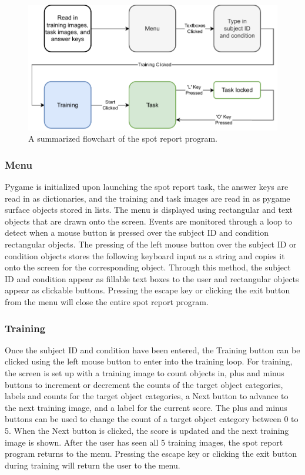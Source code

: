 \documentclass[preprint,12pt, a4paper]{elsarticle}
\begin{document}
\begin{figure}[t]
    \centering
    \includegraphics[width=0.95\linewidth]{Figures/software architecture.pdf}
    \caption{A summarized flowchart of the spot report program.}
    \label{fig:flowchart}
\end{figure}

\subsubsection{Menu}
Pygame is initialized upon launching the spot report task, the answer keys are read in as dictionaries, and the training and task images are read in as pygame surface objects stored in lists. The menu is displayed using rectangular and text objects that are drawn onto the screen. Events are monitored through a loop to detect when a mouse button is pressed over the subject ID and condition rectangular objects. The pressing of the left mouse button over the subject ID or condition objects stores the following keyboard input as a string and copies it onto the screen for the corresponding object. Through this method, the subject ID and condition appear as fillable text boxes to the user and rectangular objects appear as clickable buttons. Pressing the escape key or clicking the exit button from the menu will close the entire spot report program.

\subsubsection{Training}
Once the subject ID and condition have been entered, the Training button can be clicked using the left mouse button to enter into the training loop. For training, the screen is set up with a training image to count objects in, plus and minus buttons to increment or decrement the counts of the target object categories, labels and counts for the target object categories, a Next button to advance to the next training image, and a label for the current score. The plus and minus buttons can be used to change the count of a target object category between 0 to 5. When the Next button is clicked, the score is updated and the next training image is shown. After the user has seen all 5 training images, the spot report program returns to the menu. Pressing the escape key or clicking the exit button during training will return the user to the menu.
\end{document}
